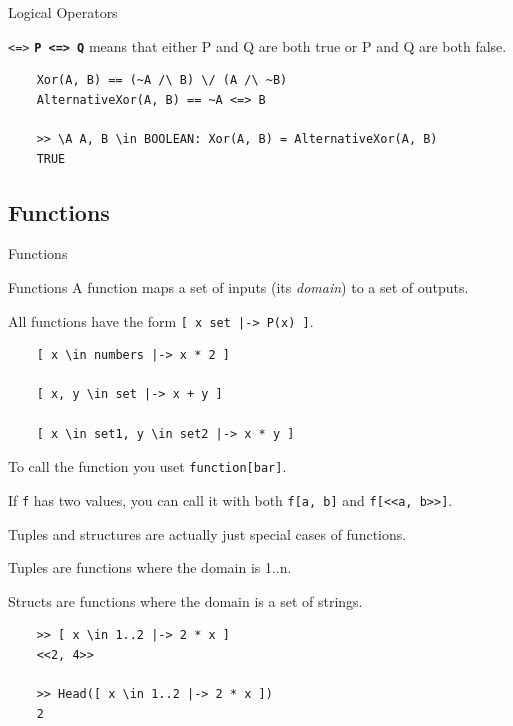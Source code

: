 \documentclass[10pt]{beamer}
\begin{document}
\begin{frame}{Logical Operators}
  \framebreak

  \begin{exampleblock}{\texttt{<=>}}
    \textbf{\texttt{P <=> Q}} means that either P and Q are both true or P and Q are both false. 
  \end{exampleblock}

  \begin{verbatim}
    Xor(A, B) == (~A /\ B) \/ (A /\ ~B)
    AlternativeXor(A, B) == ~A <=> B

    >> \A A, B \in BOOLEAN: Xor(A, B) = AlternativeXor(A, B)
    TRUE
  \end{verbatim}
    
\end{frame}

\subsection{Functions}

\begin{frame}{Functions}
  
  \begin{exampleblock}{Functions}
    A function maps a set of inputs (its \emph{domain}) to a set of outputs.

    All functions have the form \texttt{[ x \in set |-> P(x) ]}.
  \end{exampleblock} 

  \begin{verbatim}
    [ x \in numbers |-> x * 2 ]

    [ x, y \in set |-> x + y ]

    [ x \in set1, y \in set2 |-> x * y ]
  \end{verbatim}

  To call the function you uset \texttt{function[bar]}.

  If \texttt{f} has two values, you can call it with both \texttt{f[a, b]}
  and \texttt{f[<<a, b>>]}.

  \framebreak

  Tuples and structures are actually just special cases of functions.

  Tuples are functions where the domain is 1..n.

  Structs are functions where the domain is a set of strings.

  \begin{verbatim}
    >> [ x \in 1..2 |-> 2 * x ]
    <<2, 4>>

    >> Head([ x \in 1..2 |-> 2 * x ])
    2
  \end{verbatim}
  
\end{frame}
\end{document}
